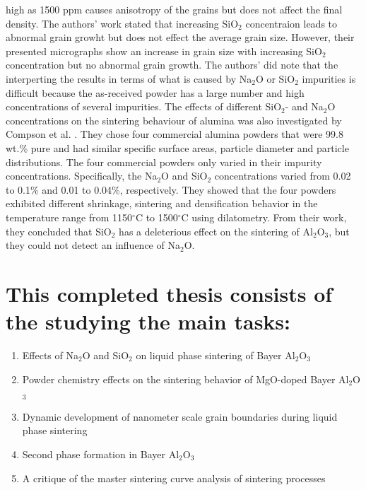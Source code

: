 high as 1500 ppm causes anisotropy of the grains but does not affect the final density. The authors' work stated that increasing SiO$_{2}$ concentraion leads to abnormal grain growht but does not effect the average grain size. However, their presented micrographs show an increase in grain size with increasing SiO$_{2}$ concentration but no abnormal grain growth. The authors' did note that the interperting the results in terms of what is caused by Na$_{2}$O or SiO$_{2}$ impurities is difficult because the as-received powder has a large number and high concentrations of several impurities. The effects of different SiO$_{2}$- and Na$_{2}$O concentrations on the sintering behaviour of alumina was also investigated by Compson et al. \cite{Compson2013}. They chose four commercial alumina powders that were 99.8 wt.\% pure and had similar specific surface areas, particle diameter and particle distributions. The four commercial powders only varied in their impurity concentrations. Specifically, the Na$_{2}$O and SiO$_{2}$ concentrations varied from 0.02 to 0.1\% and 0.01 to 0.04\%, respectively. They showed that the four powders exhibited different shrinkage, sintering and densification behavior in the temperature range from 1150$^{\circ}$C to 1500$^{\circ}$C using dilatometry. From their work, they concluded that SiO$_{2}$ has a deleterious effect on the sintering of Al$_{2}$O$_{3}$, but they could not detect an influence of Na$_{2}$O.

\pagebreak
\section*{This completed thesis consists of the studying the main tasks:}

\begin{enumerate}
	\item Effects of Na$_{2}$O and SiO$_{2}$ on liquid phase sintering of Bayer Al$_{2}$O$_{3}$
	\item Powder chemistry effects on the sintering behavior of MgO-doped Bayer Al$_{2}$O$_{3}$
	\item Dynamic development of nanometer scale grain boundaries during liquid phase sintering
	\item Second phase formation in Bayer Al$_{2}$O$_{3}$
	\item A critique of the master sintering curve analysis of sintering processes 
\end{enumerate}

